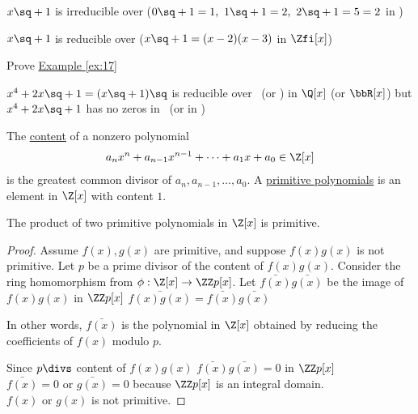 \documentclass[a4paper]{article}
\begin{document}
\begin{example} \label{ex:17}
  \( x\sq + 1 \) is irreducible over \Zth \qpmi (\( 0\sq+1=1,\ 1\sq+1 = 2,\ 2\sq + 1 = 5 = 2 \) in \Zth)

  \( x\sq + 1 \) is reducible over \Zfi \qpmi (\( x\sq+1 = (x-2)(x-3) \) in \( \Zfi[x] \))
\end{example}

\begin{exercise}
  Prove \hyperref[ex:17]{Example \ref*{ex:17}}
\end{exercise}
\begin{example}
  \( x^4+2x\sq + 1 = (x\sq + 1)\sq \) is reducible over \Q\ (or \bbR) in \( \Q[x] \) (or \( \bbR[x] \)) but \( x^4+2x\sq + 1 \) has no zeros in \Q\ (or in \bbR)
\end{example}

\begin{definition}
The \uline{content} of a nonzero polynomial \begin{align*}
  a_nx^n + a_{n-1}x^{n-1} + \cdots + a_1x+a_0 \in \Z[x]
\end{align*} is the greatest common divisor of \( a_n, a_{n-1}, \ldots, a_0 \).
A \uline{primitive polynomials} is an element in \( \Z[x] \) with content \( 1 \).
\end{definition}

\begin{lemma}
  The product of two primitive polynomials in \( \Z[x] \) is primitive.
\end{lemma}

\begin{proof}
  Assume \( f(x),g(x) \) are primitive, and suppose \( f(x)g(x) \) is not primitive.
  Let \( p \) be a prime divisor of the content of \( f(x)g(x) \).
  Consider the ring homomorphism from \( \phi:\Z[x]\to \ZZ p[x] \).
  Let \( \bar{f(x)} \bar{g(x)} \) be the image of \( f(x)g(x)  \) in \( \ZZ p[x] \) \imp \( \bar{f(x)g(x)} = \bar{f(x)}\bar{g(x)} \)
  \begin{note}
    In other words, \( \bar{f(x)} \) is the polynomial in \( \Z[x] \) obtained by reducing the coefficients of \( f(x) \) modulo \( p \).
  \end{note}
  Since \( p\divs\) content of \( f(x)g(x) \) \imp \( \bar{f(x)}\bar{g(x)}=0 \) in \( \ZZ p[x] \)\\
  \imp \( \bar{f(x)} = 0 \) or \( \bar{g(x)} = 0 \) because \( \ZZ p[x] \) is an integral domain. \\
  \imp \( f(x) \) or \( g(x) \) is not primitive. \contradiction
\end{proof}
\end{document}
